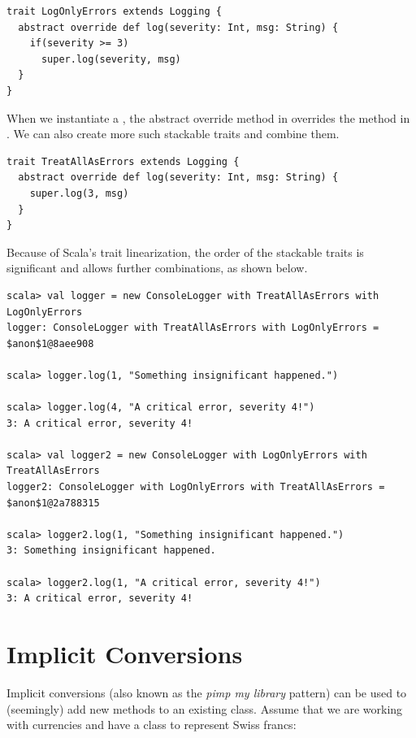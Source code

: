 \documentclass[10pt,a4paper,oneside]{scrreprt}
\begin{document}
\begin{lstlisting}
trait LogOnlyErrors extends Logging {
  abstract override def log(severity: Int, msg: String) {
    if(severity >= 3)
      super.log(severity, msg)
  }
}
\end{lstlisting}

When we instantiate a , the abstract override method in  overrides the  method in . We can also create more such stackable traits and combine them.

\begin{lstlisting}
trait TreatAllAsErrors extends Logging {
  abstract override def log(severity: Int, msg: String) {
    super.log(3, msg)
  }
}
\end{lstlisting}

Because of Scala's trait linearization, the order of the stackable traits is significant and allows further combinations, as shown below.

\begin{lstlisting}
scala> val logger = new ConsoleLogger with TreatAllAsErrors with LogOnlyErrors  
logger: ConsoleLogger with TreatAllAsErrors with LogOnlyErrors = $anon$1@8aee908

scala> logger.log(1, "Something insignificant happened.")

scala> logger.log(4, "A critical error, severity 4!")
3: A critical error, severity 4!

scala> val logger2 = new ConsoleLogger with LogOnlyErrors with TreatAllAsErrors
logger2: ConsoleLogger with LogOnlyErrors with TreatAllAsErrors = $anon$1@2a788315

scala> logger2.log(1, "Something insignificant happened.")
3: Something insignificant happened.

scala> logger2.log(1, "A critical error, severity 4!")
3: A critical error, severity 4!
\end{lstlisting}

\section{Implicit Conversions} \label{section:implicit-conversions}

Implicit conversions (also known as the \textit{pimp my library} pattern) can be used to (seemingly) add new methods to an existing class. Assume that we are working with currencies and have a class to represent Swiss francs:
\end{document}
